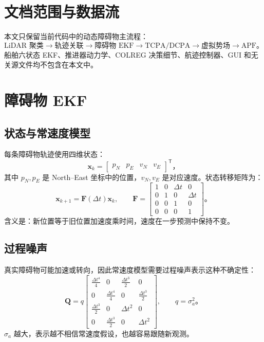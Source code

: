 \documentclass[UTF8,11pt,a4paper]{ctexart}
\begin{document}
\section{文档范围与数据流}
本文只保留当前代码中的动态障碍物主流程：
\[
\text{LiDAR 聚类}\rightarrow\text{轨迹关联}\rightarrow\text{障碍物 EKF}\rightarrow\text{TCPA/DCPA}\rightarrow\text{虚拟势场}\rightarrow\text{APF}。
\]
船舶六状态 EKF、推进器动力学、COLREG 决策细节、航迹控制器、GUI 和无关源文件均不包含在本文中。

\section{障碍物 EKF}

\subsection{状态与常速度模型}
每条障碍物轨迹使用四维状态：
\[
\bm{x}_k=\begin{bmatrix}p_N&p_E&v_N&v_E\end{bmatrix}^{\mathsf T}，
\]
其中 \(p_N,p_E\) 是 North--East 坐标中的位置，\(v_N,v_E\) 是对应速度。状态转移矩阵为：
\[
\bm{x}_{k+1}=\bm{F}(\Delta t)\bm{x}_k,
\qquad
\bm{F}=\begin{bmatrix}1&0&\Delta t&0\\0&1&0&\Delta t\\0&0&1&0\\0&0&0&1\end{bmatrix}。
\]
含义是：新位置等于旧位置加速度乘时间，速度在一步预测中保持不变。

\subsection{过程噪声}
真实障碍物可能加速或转向，因此常速度模型需要过程噪声表示这种不确定性：
\[
\bm{Q}=q\begin{bmatrix}
\frac{\Delta t^4}{4}&0&\frac{\Delta t^3}{2}&0\\
0&\frac{\Delta t^4}{4}&0&\frac{\Delta t^3}{2}\\
\frac{\Delta t^3}{2}&0&\Delta t^2&0\\
0&\frac{\Delta t^3}{2}&0&\Delta t^2
\end{bmatrix},\qquad q=\sigma_a^2。
\]
\(\sigma_a\) 越大，表示越不相信常速度假设，也越容易跟随新观测。


\end{document}
